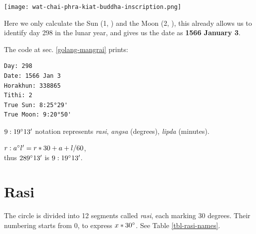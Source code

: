 \documentclass[11pt,oneside]{memoir-article}
\begin{document}
\begin{extrafullwidth}%
\begin{minipage}[c]{0.6\linewidth}%
\centering
\resizebox{\linewidth}{!}{\DuangChata[Sun={8/25/29}, Moon={9/20/50}, fancy]}
\par
\end{minipage}%
\begin{minipage}[c]{0.4\linewidth}%
\centering
\texttt{[image: wat-chai-phra-kiat-buddha-inscription.png]}
\par
\end{minipage}%
\end{extrafullwidth}

\bigskip

Here we only calculate the Sun \theSun{} (1, ) and the Moon \theMoon{}
(2, ), this already allows us to identify day 298 in the lunar year, and
gives us the date as \textbf{1566 January 3}.

\begin{marginfigure}[-1.5\baselineskip]
\raggedright\footnotesize
The code at sec. \ref{golang-mangrai} prints:

\begin{verbatim}
Day: 298
Date: 1566 Jan 3
Horakhun: 338865
Tithi: 2
True Sun: 8:25°29'
True Moon: 9:20°50'
\end{verbatim}

$9:19^\circ 13^\prime$ notation represents \textit{rasi}, \textit{angsa} (degrees), \textit{lipda} (minutes).

$r:a^\circ l^\prime = r*30 + a + l/60$,\\
thus $289^\circ 13^\prime$ is $9:19^\circ 13^\prime$.
\end{marginfigure}

\clearpage

\section{Rasi}
\label{sec-5-1}


The circle is divided into 12 segments called \emph{rasi}, each marking 30 degrees.
Their numbering starts from 0, to express $x*30^\circ$. See Table
\ref{tbl-rasi-names}.
\end{document}
